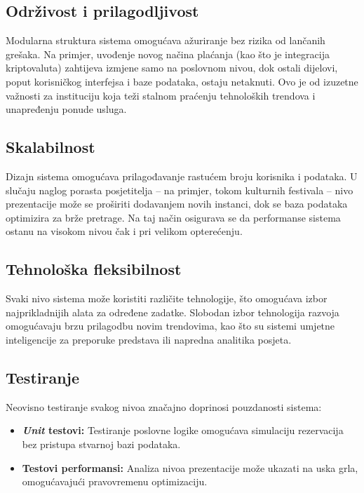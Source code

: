 \subsection{Održivost i prilagodljivost}

Modularna struktura sistema omogućava ažuriranje bez rizika od lančanih grešaka. Na primjer, uvođenje novog načina plaćanja (kao što je integracija kriptovaluta) zahtijeva izmjene samo na poslovnom nivou, dok ostali dijelovi, poput korisničkog interfejsa i baze podataka, ostaju netaknuti. Ovo je od izuzetne važnosti za instituciju koja teži stalnom praćenju tehnoloških trendova i unapređenju ponude usluga.

\subsection{Skalabilnost}

Dizajn sistema omogućava prilagođavanje rastućem broju korisnika i podataka. U slučaju naglog porasta posjetitelja – na primjer, tokom kulturnih festivala – nivo prezentacije može se proširiti dodavanjem novih instanci, dok se baza podataka optimizira za brže pretrage. Na taj način osigurava se da performanse sistema ostanu na visokom nivou čak i pri velikom opterećenju.

\subsection{Tehnološka fleksibilnost}

Svaki nivo sistema može koristiti različite tehnologije, što omogućava izbor najprikladnijih alata za određene zadatke. Slobodan izbor tehnologija razvoja omogućavaju brzu prilagodbu novim trendovima, kao što su sistemi umjetne inteligencije za preporuke predstava ili napredna analitika posjeta.

\subsection{Testiranje}

Neovisno testiranje svakog nivoa značajno doprinosi pouzdanosti sistema:
\begin{itemize}[label=\textbullet]
    \item \textbf{\textit{Unit} testovi:} Testiranje poslovne logike omogućava simulaciju rezervacija bez pristupa stvarnoj bazi podataka.
    \item \textbf{Testovi performansi:} Analiza nivoa prezentacije može ukazati na uska grla, omogućavajući pravovremenu optimizaciju.
\end{itemize}

